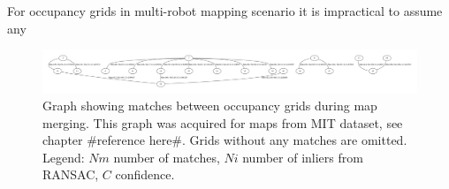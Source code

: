 For occupancy grids in multi-robot mapping scenario it is impractical to assume any

\begin{figure}
    \centering
    \includegraphics[width=\textwidth]{../img/matches.pdf}
    \caption{Graph showing matches between occupancy grids during map merging. This graph was acquired for maps from MIT dataset, see chapter \#reference here\#. Grids without any matches are omitted. Legend: $Nm$ number of matches, $Ni$ number of inliers from RANSAC, $C$ confidence.}
    \label{fig:matches}
\end{figure}

